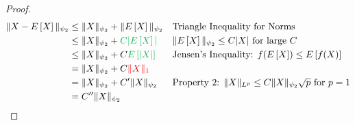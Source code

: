 \begin{proof}
\begin{align*}
    \|X - \Expect{X}\|_{\psi_2} &\leq \|X\|_{\psi_2} + \|\Expect{X}\|_{\psi_2} && \text{Triangle Inequality for Norms}\\ 
    &\leq \|X\|_{\psi_2} + \textcolor{\dgreen}{C|\Expect{X}|} && \text{$\|\Expect{X}\|_{\psi_2} \leq C|X|$ for large $C$} \\
    &\leq \|X\|_{\psi_2} + C \textcolor{\dgreen}{\Expect{|X|}} && \text{Jensen's Inequality: $f(\Expect{X}) \leq \Expect{f(X)}$} \\ 
    &= \|X\|_{\psi_2} + C \textcolor{red}{\|X\|_1} && \\
    &= \|X\|_{\psi_2} + C' \|X\|_{\psi_2} && \text{Property 2: $\|X\|_{L^p} \leq C \|X\|_{\psi_2}\sqrt{p}$ for $p=1$}\\ 
    &= C''\|X\|_{\psi_2} 
\end{align*}
\end{proof}




